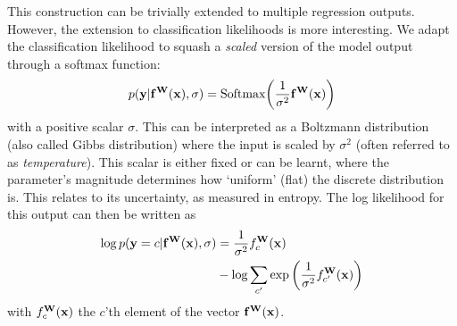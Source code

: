 This construction can be trivially extended to multiple regression outputs. However, the extension to classification likelihoods is more interesting. We adapt the classification likelihood to squash a \textit{scaled} version of the model output through a softmax function:
\begin{equation}
p(\mathbf{y} | \mathbf{f}^{\mathbf{W}}(\mathbf{x}), \sigma) = \text{Softmax} \bigg( \frac{1}{\sigma^2} \mathbf{f}^{\mathbf{W}}(\mathbf{x}) \bigg)
\end{equation}
with a positive scalar $\sigma$. 
This can be interpreted as a Boltzmann distribution (also called Gibbs distribution) where the input is scaled by $\sigma^2$ (often referred to as \textit{temperature}). This scalar is either fixed or can be learnt, where the parameter's magnitude determines how `uniform' (flat) the discrete distribution is. This relates to its uncertainty, as measured in entropy.
The log likelihood for this output can then be written as 
\begin{equation}
\begin{split}
\log p(\mathbf{y} = c | \mathbf{f}^{\mathbf{W}}(\mathbf{x}), \sigma) &= \frac{1}{\sigma^2} f^{\mathbf{W}}_c(\mathbf{x}) \\
&- \log \sum_{c'} \exp \bigg( \frac{1}{\sigma^2} f^{\mathbf{W}}_{c'}(\mathbf{x}) \bigg)
\end{split}
\end{equation}
with $f^{\mathbf{W}}_c(\mathbf{x})$ the $c$'th element of the vector $\mathbf{f}^{\mathbf{W}}(\mathbf{x})$. 

